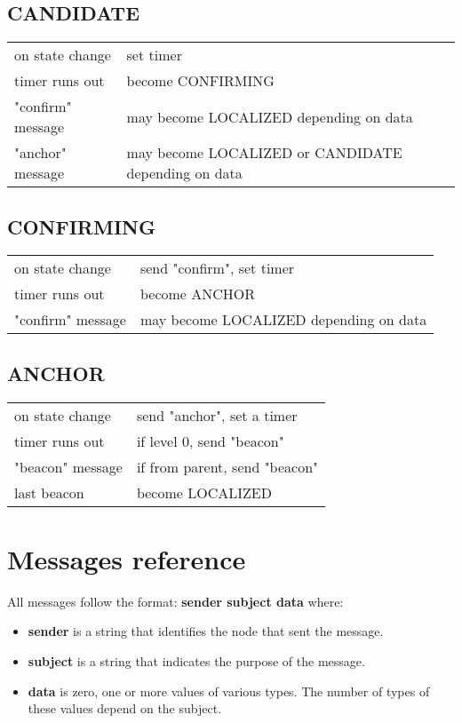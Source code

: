 \documentclass[12pt,a4paper,fleqn]{report}
\begin{document}
\begin{appendices}
\subsection*{CANDIDATE}

\begin{tabular}{p{5cm}l}
	on state change		& set timer \\
	timer runs out		& become CONFIRMING \\
	"confirm" message	& may become LOCALIZED depending on data  \\
	"anchor" message	& may become LOCALIZED or CANDIDATE depending on data \\
\end{tabular}

\subsection*{CONFIRMING}

\begin{tabular}{p{5cm}l}
	on state change		& send "confirm", set timer \\
	timer runs out		& become ANCHOR \\
	"confirm" message	& may become LOCALIZED depending on data  \\
\end{tabular}

\subsection*{ANCHOR}

\begin{tabular}{p{5cm}l}
	on state change		& send "anchor", set a timer \\
	timer runs out		& if level 0, send "beacon" \\
	"beacon" message	& if from parent, send "beacon" \\
	last beacon			& become LOCALIZED
\end{tabular}

\section*{Messages reference}

All messages follow the format: \textbf{sender subject data} where:
\begin{itemize}
	\itemsep0em
	\item \textbf{sender} is a string that identifies the node that sent the message.
	\item \textbf{subject} is a string that indicates the purpose of the message.
	\item \textbf{data} is zero, one or more values of various types. The number of types of these values depend on the subject.
\end{itemize}


\end{appendices}
\end{document}
